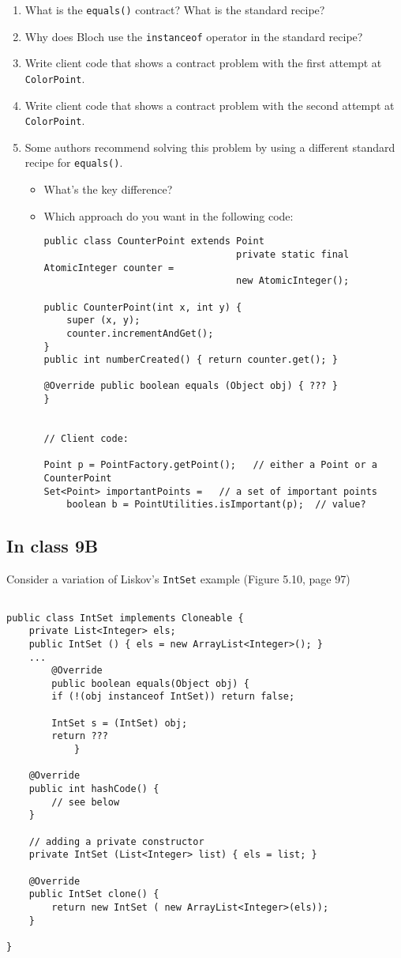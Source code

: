 \documentclass[11pt]{article}
\begin{document}
\begin{enumerate}
\item What is the \texttt{equals()} contract? What is the standard recipe?
\item Why does Bloch use the \texttt{instanceof} operator in the standard recipe?
\item Write client code that shows a contract problem with the first attempt at \texttt{ColorPoint}.
\item Write client code that shows a contract problem with the second attempt at \texttt{ColorPoint}.
\item Some authors recommend solving this problem by using a different standard recipe for \texttt{equals()}.
\begin{itemize}
\item What's the key difference?
\item Which approach do you want in the following code:
\begin{verbatim}
public class CounterPoint extends Point
                                  private static final AtomicInteger counter =
                                  new AtomicInteger();

public CounterPoint(int x, int y) {
    super (x, y);
    counter.incrementAndGet();
}
public int numberCreated() { return counter.get(); }

@Override public boolean equals (Object obj) { ??? }
}


// Client code:

Point p = PointFactory.getPoint();   // either a Point or a CounterPoint
Set<Point> importantPoints =   // a set of important points
    boolean b = PointUtilities.isImportant(p);  // value?

\end{verbatim}
\end{itemize}
\end{enumerate}

\subsection{In class 9B}
\label{sec:org9981d50}
Consider a variation of Liskov's \texttt{IntSet} example (Figure 5.10, page 97)

\begin{verbatim}

public class IntSet implements Cloneable {  
    private List<Integer> els;
    public IntSet () { els = new ArrayList<Integer>(); }
    ...
        @Override 
        public boolean equals(Object obj) { 
        if (!(obj instanceof IntSet)) return false;

        IntSet s = (IntSet) obj;
        return ???
            }

    @Override 
    public int hashCode() { 
        // see below 
    }

    // adding a private constructor
    private IntSet (List<Integer> list) { els = list; }

    @Override 
    public IntSet clone() { 
        return new IntSet ( new ArrayList<Integer>(els));
    }

}
\end{verbatim}
\end{document}
